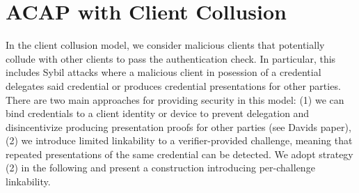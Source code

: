 \section{ACAP with Client Collusion} \label{sec:constr:sybil}

In the client collusion model, we consider malicious clients that potentially collude with other clients to pass the authentication check. In particular, this includes Sybil attacks where a malicious client in posession of a credential delegates said credential or produces credential presentations for other parties. There are two main approaches for providing security in this model: (1) we can bind credentials to a client identity or device to prevent delegation and disincentivize producing presentation proofs for other parties (see Davids paper), (2) we introduce limited linkability to a verifier-provided challenge, meaning that repeated presentations of the same credential can be detected. We adopt strategy (2) in the following and present a construction introducing per-challenge linkability.
